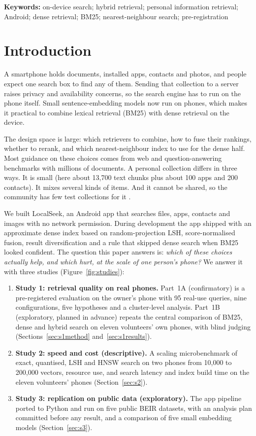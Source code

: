\documentclass[11pt,a4paper]{article}
\begin{document}
\noindent\textbf{Keywords:} on-device search; hybrid retrieval; personal information retrieval; Android; dense retrieval; BM25; nearest-neighbour search; pre-registration

\section{Introduction}

A smartphone holds documents, installed apps, contacts and photos, and people expect one search box to find any of them. Sending that collection to a server raises privacy and availability concerns, so the search engine has to run on the phone itself. Small sentence-embedding models now run on phones, which makes it practical to combine lexical retrieval (BM25) with dense retrieval on the device.

The design space is large: which retrievers to combine, how to fuse their rankings, whether to rerank, and which nearest-neighbour index to use for the dense half. Most guidance on these choices comes from web and question-answering benchmarks with millions of documents. A personal collection differs in three ways. It is small (here about 13,700 text chunks plus about 100 apps and 200 contacts). It mixes several kinds of items. And it cannot be shared, so the community has few test collections for it \citep{kim2009pseudodesktop}.

We built LocalSeek, an Android app that searches files, apps, contacts and images with no network permission. During development the app shipped with an approximate dense index based on random-projection LSH, score-normalised fusion, result diversification and a rule that skipped dense search when BM25 looked confident. The question this paper answers is: \emph{which of these choices actually help, and which hurt, at the scale of one person's phone?} We answer it with three studies (Figure~\ref{fig:studies}):
\begin{enumerate}
  \item \textbf{Study 1: retrieval quality on real phones.} Part~1A (confirmatory) is a pre-registered evaluation on the owner's phone with 95 real-use queries, nine configurations, five hypotheses and a cluster-level analysis. Part~1B (exploratory, planned in advance) repeats the central comparison of BM25, dense and hybrid search on eleven volunteers' own phones, with blind judging (Sections~\ref{sec:s1method} and~\ref{sec:s1results}).
  \item \textbf{Study 2: speed and cost (descriptive).} A scaling microbenchmark of exact, quantised, LSH and HNSW search on two phones from 10,000 to 200,000 vectors, resource use, and search latency and index build time on the eleven volunteers' phones (Section~\ref{sec:s2}).
  \item \textbf{Study 3: replication on public data (exploratory).} The app pipeline ported to Python and run on five public BEIR datasets, with an analysis plan committed before any result, and a comparison of five small embedding models (Section~\ref{sec:s3}).
\end{enumerate}
\end{document}
